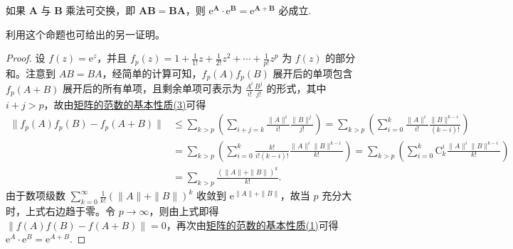 \documentclass[../../main.tex]{subfiles}%
\begin{document}
\begin{proposition}\label{proposition:矩阵乘法可交换必成立e^A乘e^B=e^A+B}
如果 $\boldsymbol{A}$ 与 $\boldsymbol{B}$ 乘法可交换，即 $\boldsymbol{A}\boldsymbol{B}=\boldsymbol{B}\boldsymbol{A}$，则 $\mathrm{e}^{\boldsymbol{A}}\cdot\mathrm{e}^{\boldsymbol{B}}=\mathrm{e}^{\boldsymbol{A}+\boldsymbol{B}}$ 必成立.
\end{proposition}
\begin{remark}
利用这个命题也可给出的另一证明。 
\end{remark}
\begin{proof}

设 $f(z)=\mathrm{e}^z$，并且 $f_p(z)=1+\frac{1}{1!}z+\frac{1}{2!}z^2+\cdots+\frac{1}{p!}z^p$ 为 $f(z)$ 的部分和。注意到 $AB = BA$，经简单的计算可知，$f_p(A)f_p(B)$ 展开后的单项包含 $f_p(A + B)$ 展开后的所有单项，且剩余单项可表示为 $\frac{A^i}{i!}\frac{B^j}{j!}$ 的形式，其中 $i + j>p$，故由\hyperref[proposition:矩阵的范数的基本性质]{矩阵的范数的基本性质(3)}可得
\begin{align*}
\parallel f_p(A)f_p(B)-f_p(A+B)\parallel &\leqslant \sum_{k>p}{\left( \sum_{i+j=k}{\frac{\parallel A\parallel ^i}{i!}\frac{\parallel B\parallel ^j}{j!}} \right)}=\sum_{k>p}{\left( \sum_{i=0}^k{\frac{\parallel A\parallel ^i}{i!}\frac{\parallel B\parallel ^{k-i}}{\left( k-i \right) !}} \right)}
\\
&=\sum_{k>p}{\left( \sum_{i=0}^k{\frac{k!}{i!\left( k-i \right) !}\frac{\parallel A\parallel ^i\parallel B\parallel ^{k-i}}{k!}} \right)}=\sum_{k>p}{\left( \sum_{i=0}^k{\mathrm{C}_{k}^{i}\frac{\parallel A\parallel ^i\parallel B\parallel ^{k-i}}{k!}} \right)}
\\
&=\sum_{k>p}{\frac{(\parallel A\parallel +\parallel B\parallel )^k}{k!}}.
\end{align*}
由于数项级数 $\sum_{k = 0}^{\infty}\frac{1}{k!}(\|A\|+\|B\|)^k$ 收敛到 $\mathrm{e}^{\|A\|+\|B\|}$，故当 $p$ 充分大时，上式右边趋于零。令 $p\to\infty$，则由上式即得 $\|f(A)f(B)-f(A + B)\| = 0$，再次由\hyperref[proposition:矩阵的范数的基本性质]{矩阵的范数的基本性质(1)}可得 $\mathrm{e}^A\cdot\mathrm{e}^B = \mathrm{e}^{A + B}$.

\end{proof}
\end{document}
